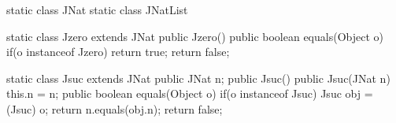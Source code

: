 static class JNat { }
static class JNatList { }

static class Jzero extends JNat {
  public Jzero() {}
  public boolean equals(Object o) {
    if(o instanceof Jzero) {
      return true;
    }
    return false;
  }
}

static class Jsuc extends JNat {
  public JNat n;
  public Jsuc() { }
  public Jsuc(JNat n) { this.n = n; }
  public boolean equals(Object o) {
    if(o instanceof Jsuc) {
      Jsuc obj = (Jsuc) o;
      return n.equals(obj.n);
    }
    return false;
  }
} 
